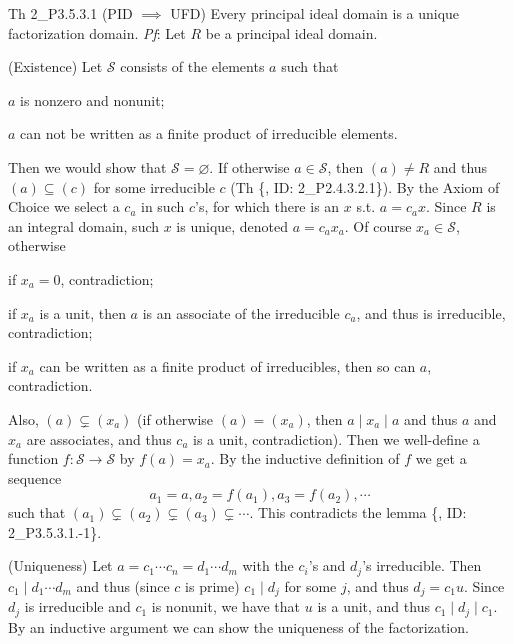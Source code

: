 \documentclass{article}
\begin{document}
\begin{Th}{Th 2\_P3.5.3.1 (PID $\implies$ UFD)}
    Every principal ideal domain is a unique factorization domain.
    \tcblower
    \textit{Pf}: Let $R$ be a principal ideal domain. 
    \begin{compactenum}
        \item (Existence) Let $\mathcal{S}$ consists of the elements $a$ such that
        \begin{compactenum}
            \item $a$ is nonzero and nonunit;
            \item $a$ can not be written as a finite product of irreducible elements.
        \end{compactenum}
        Then we would show that $\mathcal{S} = \varnothing$. If otherwise $a\in \mathcal{S}$, then $(a)\neq R$ and thus $(a)\subseteq (c)$ for some irreducible $c$ (Th \{, ID: 2\_P2.4.3.2.1\}). By the Axiom of Choice we select a $c_a$ in such $c$'s, for which there is an $x$ s.t. $a = c_a x$. Since $R$ is an integral domain, such $x$ is unique, denoted $a = c_a x_a$. Of course $x_a\in\mathcal{S}$, otherwise 
        \begin{compactenum}
            \item if $x_a=0$, contradiction;
            \item if $x_a$ is a unit, then $a$ is an associate of the irreducible $c_a$, and thus is irreducible, contradiction;
            \item if $x_a$ can be written as a finite product of irreducibles, then so can $a$, contradiction.
        \end{compactenum}
        Also, $(a)\subsetneq (x_a)$ (if otherwise $(a)=(x_a)$, then $a\mid x_a\mid a$ and thus $a$ and $x_a$ are associates, and thus $c_a$ is a unit, contradiction). 
        Then we well-define a function $f:\mathcal{S}\to\mathcal{S}$ by $f(a) = x_a$. By the inductive definition of $f$ we get a sequence
        $$ a_1 = a, a_2 = f(a_1), a_3 = f(a_2), \cdots $$
        such that $(a_1)\subsetneq (a_2)\subsetneq (a_3)\subsetneq \cdots $. This contradicts the lemma \{, ID: 2\_P3.5.3.1.-1\}.
        \item (Uniqueness) Let $a = c_1\cdots c_n = d_1\cdots d_m$ with the $c_i$'s and $d_j$'s irreducible. Then $c_1\mid d_1\cdots d_m$ and thus (since $c$ is prime) $c_1\mid d_j$ for some $j$, and thus $d_j = c_1 u$. Since $d_j$ is irreducible and $c_1$ is nonunit, we have that $u$ is a unit, and thus $c_1\mid d_j\mid c_1$. By an inductive argument we can show the uniqueness of the factorization.
    \end{compactenum}
\end{Th}
\end{document}
